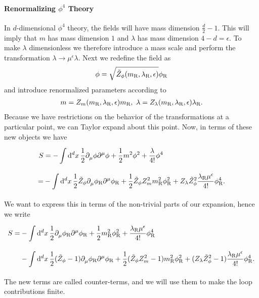 \paragraph{Renormalizing $\phi^{4}$ Theory}
In $d$-dimensional $\phi^{4}$ theory, the fields will have mass dimension $\frac{d}{2} - 1$. This will imply that $m$ has mass dimension $1$ and $\lambda$ has mass dimension $4 - d = \epsilon$. To make $\lambda$ dimensionless we therefore introduce a mass scale and perform the transformation $\lambda\to\mu^{\epsilon}\lambda$. Next we redefine the field as
\begin{align*}
	\phi = \sqrt{\tilde{Z}_{\phi}(m_{\text{R}}, \lambda_{\text{R}}, \epsilon)}\phi_{\text{R}}
\end{align*}
and introduce renormalized parameters according to
\begin{align*}
	m = Z_{m}(m_{\text{R}}, \lambda_{\text{R}}, \epsilon)m_{\text{R}},\ \lambda = Z_{\lambda}(m_{\text{R}}, \lambda_{\text{R}}, \epsilon)\lambda_{\text{R}}.
\end{align*}
Because we have restrictions on the behavior of the transformations at a particular point, we can Taylor expand about this point. Now, in terms of these new objects we have
\begin{align*}
	S &= -\int\limits_{}^{}\dd[d]{x}\frac{1}{2}\partial^{}_{\mu}\phi\partial^{\mu}_{}\phi + \frac{1}{2}m^{2}\phi^{2} + \frac{\lambda}{4!}\phi^{4} \\
	  =& -\int\limits_{}^{}\dd[d]{x}\frac{1}{2}\tilde{Z}_{\phi}\partial^{}_{\mu}\phi_{\text{R}}\partial^{\mu}_{}\phi_{\text{R}} + \frac{1}{2}\tilde{Z}_{\phi}Z_{m}^{2}m_{\text{R}}^{2}\phi_{\text{R}}^{2} + Z_{\lambda}\tilde{Z}_{\phi}^{2}\frac{\lambda_{\text{R}}\mu^{\epsilon}}{4!}\phi_{\text{R}}^{4}.
\end{align*}
We want to express this in terms of the non-trivial parts of our expansion, hence we write
\begin{align*}
	S =& -\int\limits_{}^{}\dd[d]{x}\frac{1}{2}\partial^{}_{\mu}\phi_{\text{R}}\partial^{\mu}_{}\phi_{\text{R}} + \frac{1}{2}m_{\text{R}}^{2}\phi_{\text{R}}^{2} + \frac{\lambda_{\text{R}}\mu^{\epsilon}}{4!}\phi_{\text{R}}^{4} \\
	   &- \int\limits_{}^{}\dd[d]{x}\frac{1}{2}(\tilde{Z}_{\phi} - 1)\partial^{}_{\mu}\phi_{\text{R}}\partial^{\mu}_{}\phi_{\text{R}} + \frac{1}{2}(\tilde{Z}_{\phi}Z_{m}^{2} - 1)m_{\text{R}}^{2}\phi_{\text{R}}^{2} + (Z_{\lambda}\tilde{Z}_{\phi}^{2} - 1)\frac{\lambda_{\text{R}}\mu^{\epsilon}}{4!}\phi_{\text{R}}^{4}.
\end{align*}
The new terms are called counter-terms, and we will use them to make the loop contributions finite.

